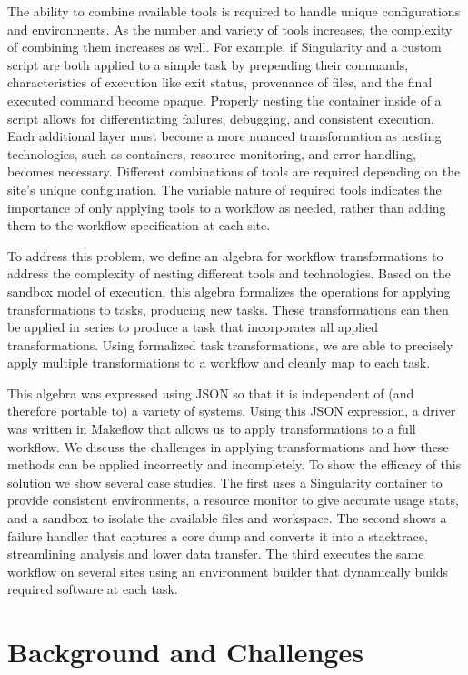 \documentclass[conference]{IEEEtran}
\begin{document}
The ability to combine available tools is required
to handle unique configurations and environments.
As the number and variety of tools increases, 
the complexity of combining them increases as well.
For example, if 
Singularity and a custom script
are both applied to a simple task by prepending their
commands, characteristics of execution like
exit status, provenance of files, and
the final executed command become opaque.
Properly nesting the container inside of a
script allows for differentiating failures, 
debugging, and consistent execution.
Each additional layer must become a more nuanced transformation
as nesting technologies, 
such as containers,
resource monitoring, 
and error handling,
becomes necessary.
Different combinations of tools are required
depending on the site's unique configuration.
The variable nature of required tools indicates
the importance of only applying tools to a workflow as needed, 
rather than adding them to the workflow specification at each site.

To address this problem,
we define an algebra for workflow transformations
to address the complexity of
nesting different tools and technologies.
Based on the sandbox model of execution, 
this algebra formalizes the operations
for applying transformations to tasks, 
producing new tasks.
These transformations can then be applied
in series to produce a task that incorporates
all applied transformations.
Using formalized task transformations,
we are able to precisely apply multiple transformations to a workflow 
and cleanly map to each task.

This algebra was expressed using JSON 
so that it is independent of
(and therefore portable to)
a variety of systems. 
Using this JSON expression, a driver was written
in Makeflow\cite{makeflow-sweet12} that allows us to apply transformations 
to a full workflow.
We discuss the challenges 
in applying transformations and 
how these methods can
be applied incorrectly and incompletely. 
To show the efficacy of this solution
we show several case studies. 
The first uses a Singularity container 
to provide consistent environments, 
a resource monitor to give accurate usage stats, and
a sandbox to isolate the available files and workspace.
The second shows a failure handler that captures a
core dump and converts it into a stacktrace, 
streamlining analysis and lower data transfer.
The third executes the same workflow on
several sites using an environment builder 
that dynamically builds required software at each task. 

\section{Background and Challenges}
\end{document}
